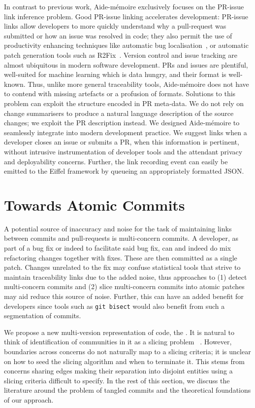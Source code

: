 In contrast to previous work, Aide-mémoire exclusively focuses on the PR-issue
link inference problem. Good PR-issue linking accelerates development: PR-issue
links allow developers to more quickly understand why a pull-request was
submitted or how an issue was resolved in code; they also permit the use of
productivity enhancing techniques like automatic bug
localisation~\cite{BugLocBasedOnHistory, SoftChangeToBugLoc}, or automatic patch
generation tools such as R2Fix~\cite{R2Fix}. Version control and issue tracking
are almost ubiquitous in modern software development. PRs and issues are
plentiful, well-suited for machine learning which is data hungry, and their
format is well-known. Thus, unlike more general traceability tools, Aide-mémoire
does not have to contend with missing artefacts or a profusion of formats.
Solutions to this problem can exploit the structure encoded in PR meta-data. We
do not rely on change summarisers to produce a natural language description of
the source changes; we exploit the PR description instead. We designed
Aide-mémoire to seamlessly integrate into modern development practice. We
suggest links when a developer closes an issue or submits a PR, when this
information is pertinent, without intrusive instrumentation of developer tools
and the attendant privacy and deployability concerns. Further, the link
recording event can easily be emitted to the Eiffel framework by queueing an
appropriately formatted JSON.

\section{Towards Atomic Commits}
\label{chapter:literature:sec:flexeme_rel_work}

A potential source of inaccuracy and noise for the task of maintaining links
between commits and pull-requests is multi-concern commits. A developer, as part
of a bug fix or indeed to facilitate said bug fix, can and indeed do mix
refactoring changes together with fixes. These are then committed as a single
patch. Changes unrelated to the fix may confuse statistical tools that strive to
maintain traceability links due to the added noise, thus approaches to (1)
detect multi-concern commits and (2) slice multi-concern commits into atomic
patches may aid reduce this source of noise. Further, this can have an added
benefit for developers since tools such as \lstinline+git bisect+ would also
benefit from such a segmentation of commits.

We propose a new multi-version representation of code, the
\deltaPDGN. It is natural to think of identification of communities in it as a
slicing problem ~\cite{slicingsurvey}. However, boundaries across concerns do
not naturally map to a slicing criteria; it is unclear on how to seed the
slicing algorithm and when to terminate it. This stems from concerns sharing
edges making their separation into disjoint entities using a slicing criteria
difficult to specify. In the rest of this section, we discuss the literature
around the problem of tangled commits and the theoretical foundations of
our approach.

